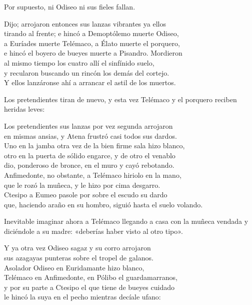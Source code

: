 Por supuesto, ni Odiseo ni sus fieles fallan.

\begin{versocita}
Dijo; arrojaron entonces sus lanzas vibrantes ya ellos\\
tirando al frente; e hincó a Demoptólemo muerte Odiseo,\\
a Euríades muerte Telémaco, a Élato muerte el porquero,\\
e hincó el boyero de bueyes muerte a Pisandro. Mordieron\\
al mismo tiempo los cuatro allí el sinfínido suelo,\\
y recularon buscando un rincón los demás del cortejo.\\
Y ellos lanzáronse ahí a arrancar el astil de los muertos.
\end{versocita}

Los pretendientes tiran de nuevo, y esta vez Telémaco y el porquero reciben heridas leves:

\begin{versocita}
Los pretendientes sus lanzas por vez segunda arrojaron\\
en mismas ansias, y Atena frustró casi todos sus dardos.\\
Uno en la jamba otra vez de la bien firme sala hizo blanco,\\
otro en la puerta de sólido engarce, y de otro el venablo\\
dio, ponderoso de bronce, en el muro y cayó rebotando.\\
Anfimedonte, no obstante, a Telémaco hiriolo en la mano,\\
que le rozó la muñeca, y le hizo por cima desgarro.\\
Ctesipo a Eumeo pasole por sobre el escudo su dardo\\
que, haciendo araño en su hombro, siguió hasta el suelo volando.
\end{versocita}

Inevitable imaginar ahora a Telémaco llegando a casa con la muñeca vendada y diciéndole a su madre: «deberías haber visto al otro tipo».

\begin{versocita}
Y ya otra vez Odiseo sagaz y su corro arrojaron\\
sus azagayas punteras sobre el tropel de galanos.\\
Asolador Odiseo en Euridamante hizo blanco,\\
Telémaco en Anfimedonte, en Pólibo el guardamarranos,\\
y por su parte a Ctesipo el que tiene de bueyes cuidado\\
le hincó la suya en el pecho mientras decíale ufano:
\end{versocita}

